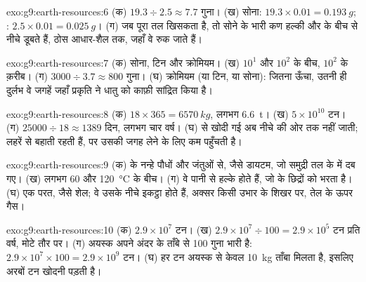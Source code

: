 \begin{solution}{exo:g9:earth-resources:6}
(क) $19.3 \div 2.5 \approx 7.7$ गुना। (ख) सोना: $19.3 \times 0.01 =
\qty{0.193}{g}$; : $2.5 \times 0.01 = \qty{0.025}{g}$। (ग) जब पूरा तल
खिसकता है, तो सोने के भारी कण हल्की  और  के बीच से नीचे डूबते हैं, ठोस आधार-शैल
तक, जहाँ वे रुक जाते हैं।
\end{solution}

\begin{solution}{exo:g9:earth-resources:7}
(क) सोना, टिन और क्रोमियम। (ख) $10^1$ और $10^2$ के बीच, $10^2$ के
क़रीब। (ग) $3000 \div 3.7 \approx 800$ गुना। (घ) क्रोमियम (या टिन, या सोना):
 जितना ऊँचा, उतनी ही दुर्लभ वे जगहें जहाँ प्रकृति ने धातु को काफ़ी सांद्रित
किया है।
\end{solution}

\begin{solution}{exo:g9:earth-resources:8}
(क) $18 \times 365 = \qty{6570}{kg}$, लगभग \qty{6.6}{t}। (ख) $5 \times
10^{10}$ टन। (ग) $25000 \div 18 \approx 1389$ दिन, लगभग चार वर्ष।
(घ)  से खोदी गई  अब नीचे की ओर  तक नहीं जाती; लहरें   से  बहाती
रहती हैं, पर उसकी जगह लेने के लिए कम  पहुँचती
है।
\end{solution}

\begin{solution}{exo:g9:earth-resources:9}
(क)  के नन्हे पौधों और जंतुओं से, जैसे डायटम, जो समुद्री तल के  में दब गए।
(ख) लगभग 60 और \qty{120}{\degreeCelsius} के बीच।
(ग) वे पानी से हल्के होते हैं, जो  के छिद्रों को भरता है।
(घ) एक  परत, जैसे शेल; वे उसके नीचे इकट्ठा होते हैं, अक्सर किसी उभार के शिखर पर,
तेल के ऊपर गैस।
\end{solution}

\begin{solution}{exo:g9:earth-resources:10}
(क) $2.9 \times 10^7$ टन। (ख) $2.9 \times 10^7 \div 100 = 2.9 \times
10^5$ टन प्रति वर्ष, मोटे तौर पर। (ग) अयस्क अपने अंदर के ताँबे से 100 गुना भारी है:
$2.9 \times 10^7 \times 100 = 2.9 \times 10^9$ टन।
(घ) हर टन अयस्क से केवल \qty{10}{kg} ताँबा मिलता है, इसलिए अरबों टन  खोदनी
पड़ती है।
\end{solution}


